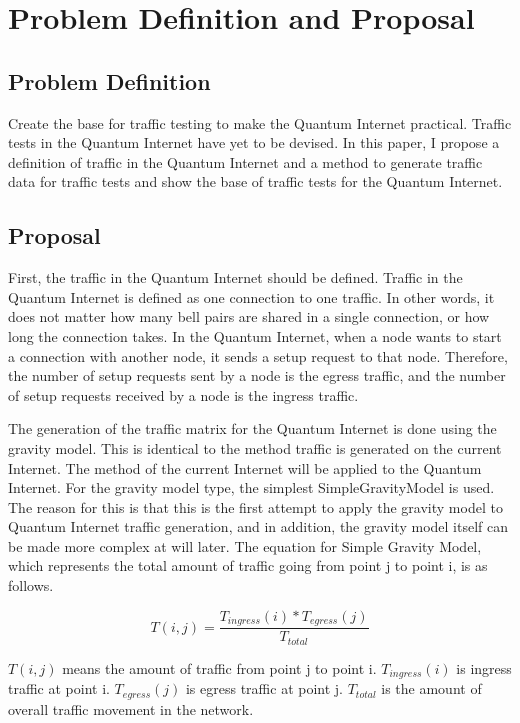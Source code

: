 \chapter{Problem Definition and Proposal}
\label{problem_definition_and_proposal}

\section{Problem Definition}
Create the base for traffic testing to make the Quantum Internet practical. 
Traffic tests in the Quantum Internet have yet to be devised. 
In this paper, I propose a definition of traffic in the Quantum Internet and a method to generate traffic data for traffic tests and show the base of traffic tests for the Quantum Internet.

\section{Proposal}
First, the traffic in the Quantum Internet should be defined. 
Traffic in the Quantum Internet is defined as one connection to one traffic. 
In other words, it does not matter how many bell pairs are shared in a single connection, or how long the connection takes.
In the Quantum Internet, when a node wants to start a connection with another node, it sends a setup request to that node.
Therefore, the number of setup requests sent by a node is the egress traffic, and the number of setup requests received by a node is the ingress traffic.

The generation of the traffic matrix for the Quantum Internet is done using the gravity model. 
This is identical to the method traffic is generated on the current Internet. 
The method of the current Internet will be applied to the Quantum Internet.
For the gravity model type, the simplest SimpleGravityModel is used.
The reason for this is that this is the first attempt to apply the gravity model to Quantum Internet traffic generation, and in addition, the gravity model itself can be made more complex at will later.
The equation for Simple Gravity Model\cite{zhang2003fast}\cite{trafficmatrix_presentation}, which represents the total amount of traffic going from point j to point i, is as follows.
\begin{screen}
    \begin{dfn}
        \begin{equation}
            T(i,j) = \frac{T_{ingress}(i)*T_{egress}(j)}{T_{total}}
        \end{equation}
    \end{dfn}
    $T(i,j)$ means the amount of traffic from point j to point i. 
    $T_{ingress}(i)$ is ingress traffic at point i.
    $T_{egress}(j)$ is egress traffic at point j.
    $T_{total}$ is the amount of overall traffic movement in the network.
\end{screen}

